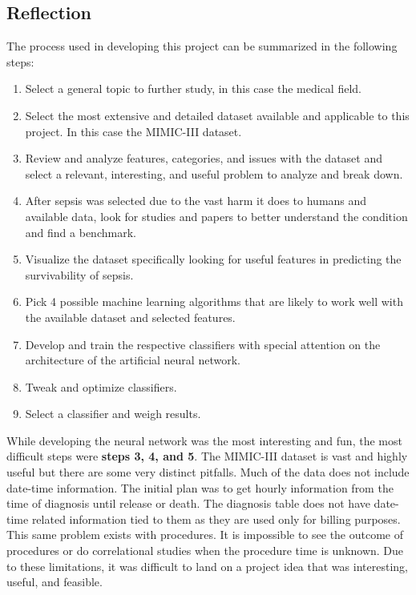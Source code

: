 \documentclass[11pt]{article}
\begin{document}
	\subsection{Reflection}
	The process used in developing this project can be summarized in the following steps:
	\begin{enumerate}
		\item Select a general topic to further study, in this case the medical field.
		\item Select the most extensive and detailed dataset available and applicable to this project. In this case the MIMIC-III dataset.
		\item Review and analyze features, categories, and issues with the dataset and select a relevant, interesting, and useful problem to analyze and break down.
		\item After sepsis was selected due to the vast harm it does to humans and available data, look for studies and papers to better understand the condition and find a benchmark.
		\item Visualize the dataset specifically looking for useful features in predicting the survivability of sepsis.
		\item Pick 4 possible machine learning algorithms that are likely to work well with the available dataset and selected features.
		\item Develop and train the respective classifiers with special attention on the architecture of the artificial neural network.
		\item Tweak and optimize classifiers.
		\item Select a classifier and weigh results.
	\end{enumerate}

    While developing the neural network was the most interesting and fun, the most difficult steps were \textbf{steps 3, 4, and 5}. The MIMIC-III dataset is vast and highly useful but there are some very distinct pitfalls. Much of the data does not include date-time information. The initial plan was to get hourly information from the time of diagnosis until release or death. The diagnosis table does not have date-time related information tied to them as they are used only for billing purposes. This same problem exists with procedures. It is impossible to see the outcome of procedures or do correlational studies when the procedure time is unknown. Due to these limitations, it was difficult to land on a project idea that was interesting, useful, and feasible.
\end{document}
